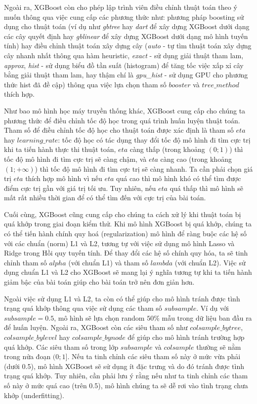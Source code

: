 \documentclass{article}
\begin{document}
Ngoài ra, XGBoost còn cho phép lập trình viên điều chỉnh thuật toán theo ý muốn thông qua việc cung cấp các phương thức như: phương pháp boosting sử dụng cho thuật toán (ví dụ như \textit{gbtree} hay \textit{dart} để xây dựng XGBoost dưới dạng các cây quyết định hay \textit{gblinear} để xây dựng XGBoost dưới dạng mô hình tuyến tính) hay điều chỉnh thuật toán xây dựng cây (\textit{auto} - tự tìm thuật toán xây dựng cây nhanh nhất thông qua hàm heuristic, \textit{exact} - sử dụng giải thuật tham lam, \textit{approx}, \textit{hist} - sử dụng biểu đồ tần suất (histogram) để tăng tốc việc xấp xỉ cây bằng giải thuật tham lam, hay thậm chí là \textit{gpu\_hist} - sử dụng GPU cho phương thức hist đã đề cập) thông qua việc lựa chọn tham số $booster$ và $tree\_method$ thích hợp.

Như bao mô hình học máy truyền thống khác, XGBoost cung cấp cho chúng ta phương thức để điều chỉnh tốc độ học trong quá trình huấn luyện thuật toán. Tham số để điều chỉnh tốc độ học cho thuật toán được xác định là tham số $eta$ hay $learning\_rate$: tốc độ học có tác dụng thay đổi tốc độ mô hình đi tìm cực trị khi ta tiến hành thực thi thuật toán, $eta$ càng thấp (trong khoảng $\left(0; 1\right)$) thì tốc độ mô hình đi tìm cực trị sẽ càng chậm, và $eta$ càng cao (trong khoảng $\left(1; +\infty\right)$) thì tốc độ mô hình đi tìm cực trị sẽ càng nhanh. Ta cần phải chọn giá trị $eta$ thích hợp mô hình vì nếu $eta$ quá cao thì mô hình khó có thể tìm được điểm cực trị gần với giá trị tối ưu. Tuy nhiên, nếu $eta$ quá thấp thì mô hình sẽ mất rất nhiều thời gian để có thể tìm đến với cực trị của bài toán.

Cuối cùng, XGBoost cũng cung cấp cho chúng ta cách xử lý khi thuật toán bị quá khớp trong giai đoạn kiểm thử. Khi mô hình XGBoost bị quá khớp, chúng ta có thể tiến hành chính quy hoá (regularization) mô hình để ràng buộc các hệ số với các chuẩn (norm) L1 và L2, tương tự với việc sử dụng mô hình Lasso và Ridge trong Hồi quy tuyến tính. Để thay đổi các hệ số chính quy hóa, ta sẽ tinh chỉnh tham số $alpha$ (với chuẩn L1) và tham số $lambda$ (với chuẩn L2). Việc sử dụng chuẩn L1 và L2 cho XGBoost sẽ mang lại ý nghĩa tương tự khi ta tiến hành giảm bậc của bài toán giúp cho bài toán trở nên đơn giản hơn. 

Ngoài việc sử dụng L1 và L2, ta còn có thể giúp cho mô hình tránh được tình trạng quá khớp thông qua việc sử dụng các tham số $subsample$. Ví dụ với $subsample = 0.5$, mô hình sẽ lựa chọn random $50\%$ mẫu trong dữ liệu ban đầu ra để huấn luyện. Ngoài ra, XGBoost còn các siêu tham số như $colsample\_bytree$, $colsample\_bylevel$ hay $colsample\_bynode$ để giúp cho mô hình tránh trường hợp quá khớp. Các siêu tham số trong lớp $subsample$ và $colsample$ thường sẽ nằm trong nửa đoạn $(0;1]$. Nếu ta tinh chỉnh các siêu tham số này ở mức vừa phải (dưới 0.5), mô hình XGBoost sẽ sử dụng ít đặc trưng và do đó tránh được tình trạng quá khớp. Tuy nhiên, cần phải lưu ý rằng nếu như ta tinh chỉnh các tham số này ở mức quá cao (trên 0.5), mô hình chúng ta sẽ dễ rơi vào tình trạng chưa khớp (underfitting).
\end{document}
